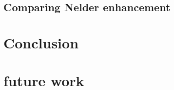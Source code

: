 \documentclass[a4paper,twoside]{article}
\begin{document}
\subsection{ Comparing Nelder enhancement}

\section{Conclusion}
\label{sec:Conclusion}
\section{future work}
%
%
%


\end{document}
